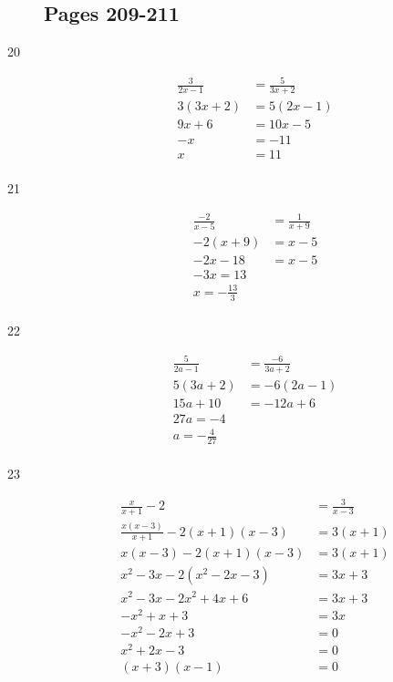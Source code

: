 \documentclass[fleqn,addpoints]{exam}
\begin{document}
\begin{description}

\subsection{Pages 209-211}

\item[20] 
\begin{align*}
  \frac{3}{2x-1} &= \frac{5}{3x+2} \\
  3(3x+2) &= 5(2x-1) \\
  9x+6 &= 10x-5 \\
  -x &= -11 \\
  x &= 11 \\
\end{align*}

\item[21]
\begin{align*}
  \frac{-2}{x-5} &= \frac{1}{x+9} \\
  -2(x+9) &= x-5 \\
  -2x-18 &= x-5 \\
  -3x = 13 \\
  x = - \frac{13}{3} \\
\end{align*}

\item[22]
\begin{align*}
  \frac{5}{2a-1} &= \frac{-6}{3a+2} \\
  5(3a+2) &= -6(2a-1) \\
  15a+10 &= -12a+6 \\
  27a = -4 \\
  a = -\frac{4}{27} \\
\end{align*}

\item[23]
\begin{align*}
  \frac{x}{x+1} - 2 &= \frac{3}{x-3} \\
   \frac{x(x-3)}{x+1} - 2(x+1)(x-3) &= 3(x+1) \\
   x(x-3) - 2(x+1)(x-3) &= 3(x+1) \\
   x^2-3x - 2(x^2-2x-3) &= 3x+3 \\
   x^2-3x - 2x^2 + 4x + 6 &= 3x+3 \\
   -x^2 + x + 3 &= 3x \\
   -x^2 - 2x + 3 &= 0 \\
   x^2 + 2x - 3 &= 0 \\
   (x+3)(x-1) &= 0 \\
\end{align*}


\end{description}
\end{document}
